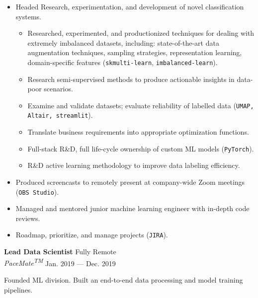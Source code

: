 \documentclass[a4paper,12pt]{article}
\newcommand{\ressubheading}[4]{{\begin{minipage}{\textwidth}
                                    \textbf{#1} \hfill #2 \\
                                    \textit{#3} \hfill #4 \\
\end{minipage}}}
\begin{document}
\begin{itemize}
        \item Headed Research, experimentation, and development of novel classification systems.
        \begin{itemize}
            \item Researched, experimented, and productionized techniques for dealing with extremely imbalanced datasets, including: state-of-the-art data augmentation techniques, sampling strategies,  representation learning, domain-specific features (\texttt{skmulti-learn}, \texttt{imbalanced-learn}).
            \item Research semi-supervised methods to produce actionable insights in data-poor scenarios.
            \item Examine and validate datasets;
            evaluate reliability of labelled data (\texttt{UMAP, Altair, streamlit}).
            \item Translate business requirements into appropriate optimization functions.
            \item Full-stack R\&D, full life-cycle ownership of custom ML models (\texttt{PyTorch}).
            \item R\&D active learning methodology to improve data labeling efficiency.
        \end{itemize}
        \item Produced screencasts to remotely present at company-wide Zoom meetings (\texttt{OBS Studio}).
        \item Managed and mentored junior machine learning engineer with in-depth code reviews.
        \item Roadmap, prioritize, and manage projects (\texttt{JIRA}).

    \end{itemize}


    \ressubheading{Lead Data Scientist}{Fully Remote}{PaceMate\textsuperscript{TM}}{Jan. 2019 --- Dec. 2019}

    \vspace{-6pt} Founded ML division. Built an end-to-end data processing and model training pipelines.
\end{document}
